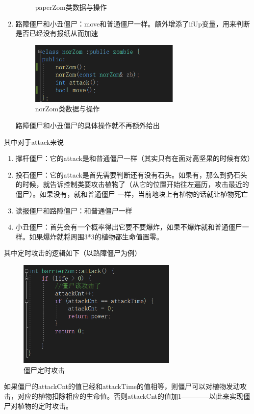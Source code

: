 \documentclass[12pt,a4paper,UTF8]{article}
\begin{document}
\begin{enumerate}
\begin{figure}[H]
        \caption{paperZom类数据与操作}
        \end{figure}
        \item 路障僵尸和小丑僵尸：move和普通僵尸一样。额外增添了ifUp变量，用来判断是否已经没有报纸从而加速
        \begin{figure}[H]
          \centering
        \includegraphics[width=0.7\textwidth]{figure/norZom.png}
        \caption{norZom类数据与操作}
        \end{figure}
        路障僵尸和小丑僵尸的具体操作就不再额外给出
        
      \end{enumerate}
      其中对于attack来说
      \begin{enumerate}
        \item 撑杆僵尸：它的attack是和普通僵尸一样（其实只有在面对高坚果的时候有效）
        \item 投石僵尸：它的attack是首先需要判断还有没有石头。如果有，那么到扔石头的时候，就告诉控制类要攻击植物了（从它的位置开始往左遍历，攻击最近的僵尸）。如果没有，就和普通僵尸
        一样，当前地块上有植物的话就让植物死亡
        \item 读报僵尸和路障僵尸：和普通僵尸一样
        \item 小丑僵尸：首先会有一个概率得出它要不要爆炸，如果不爆炸就和普通僵尸一样。如果爆炸就将周围3*3的植物都生命值置零。
      \end{enumerate}
      其中定时攻击的逻辑如下（以路障僵尸为例）
      \begin{figure}[H]
        \centering
      \includegraphics[width=0.7\textwidth]{figure/zomAttack.png}
      \caption{僵尸定时攻击}
      \end{figure}
      如果僵尸的attackCnt的值已经和attackTime的值相等，则僵尸可以对植物发动攻击，对应的植物扣除相应的生命值。否则attackCnt的值加1————以此来实现僵尸对植物的定时攻击。
      
\end{document}
